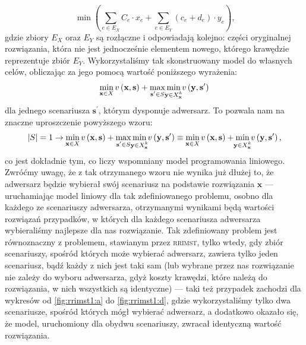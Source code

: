 \begin{equation}
	\min \left( \sum_{e \in E_{X}} C_{e} \cdot x_{e} + \sum_{e \in E_{Y}} \left( c_{e} + d_{e} \right) \cdot y_{e} \right)\text{,}
\end{equation}
gdzie zbiory $E_{X}$ oraz $E_{Y}$ są rozłączne i odpowiadają kolejno: części oryginalnej rozwiązania, która nie jest jednocześnie elementem nowego, którego krawędzie reprezentuje zbiór $E_{Y}$. Wykorzystaliśmy tak skonstruowany model do własnych celów, obliczając za jego pomocą wartość poniższego wyrażenia:
\begin{equation}
\min_{\mathclap{\textbf{x} \in X}} v \left( \textbf{x}, \textbf{s} \right) + \max_{\mathclap{\textbf{s}^{\prime} \in S}} \min_{\mathclap{\textbf{y} \in X^{k}_{\textbf{x}}}} v \left( \textbf{y}, \textbf{s}^{\prime} \right)
\end{equation}
dla jednego scenariusza $\textbf{s}^{\prime}$, którym dysponuje adwersarz. To pozwala nam na znaczne uproszczenie powyższego wzoru:
\begin{equation}
 \left| S \right| = 1 \rightarrow \min_{\mathclap{\textbf{x} \in X}} v \left( \textbf{x}, \textbf{s} \right) + \max_{\mathclap{\textbf{s}^{\prime} \in S}} \min_{\mathclap{\textbf{y} \in X^{k}_{\textbf{x}}}} v \left( \textbf{y}, \textbf{s}^{\prime} \right) \equiv \min_{\mathclap{\textbf{x} \in X}} v \left( \textbf{x}, \textbf{s} \right) + \min_{\mathclap{\textbf{y} \in X^{k}_{\textbf{x}}}} v \left( \textbf{y}, \textbf{s}^{\prime} \right)\text{,}
\end{equation}
co jest dokładnie tym, co liczy wspomniany model programowania liniowego. Zwróćmy uwagę, że z tak otrzymanego wzoru nie wynika już dłużej to, że adwersarz będzie wybierał swój scenariusz na podstawie rozwiązania $\textbf{x}$ --- uruchamiając model liniowy dla tak zdefiniowanego problemu, osobno dla każdego ze scenariuszy adwersarza, otrzymanymi wynikami będą wartości rozwiązań przypadków, w których dla każdego scenariusza adwersarza wybieraliśmy najlepsze dla nas rozwiązanie. Tak zdefiniowany problem jest równoznaczny z problemem, stawianym przez \textsc{rrimst}, tylko wtedy, gdy zbiór scenariuszy, spośród których może wybierać adwersarz, zawiera tylko jeden scenariusz, bądź każdy z nich jest taki sam (lub wybrane przez nas rozwiązanie nie zależy do wyboru adwersarza, gdyż koszty krawędzi, które należą do rozwiązania, w nich wszystkich są identyczne) --- taki też przypadek zachodzi dla wykresów od \ref{fig:rrimst1:a} do \ref{fig:rrimst1:d}, gdzie wykorzystaliśmy tylko dwa scenariusze, spośród których mógł wybierać adwersarz, a dodatkowo okazało się, że model, uruchomiony dla obydwu scenariuszy, zwracał identyczną wartość rozwiązania.


